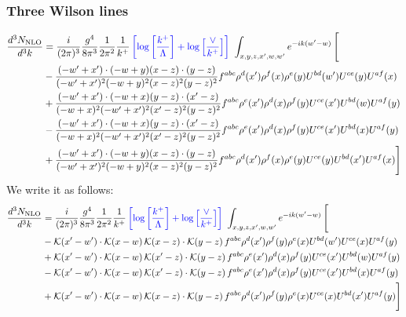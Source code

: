 \documentclass[aps,prd,amsmath,amssymb,nofootinbib]{revtex4-2}
\numberwithin{equation}{section}
\begin{document}
\subsubsection{Three Wilson lines}
\begin{align}
      \frac{d^{3}N_{\rm NLO}}{d^{3}k} & = \frac{i}{(2\pi)^{3}}\frac{g^{4}}{8\pi^{3}}\frac{1}{2\pi^{2}} \frac{1}{k^{+}}\,{\color{blue}\left[\log{\left[\frac{k^{+}}{\Lambda}\right]}+\log{\left[\frac{\vee}{k^{+}}\right]}\right]}\,\,\int_{x,y,z,x^{\prime},w,w^{\prime}}e^{-ik(w^{\prime}-w)}\, \Bigg[\notag \\ & -  \frac{( - w' + x') \cdot ( - w + y) (x - z) \cdot (y - z)}{( - w' + x')^{2} ( - w + y)^{2} (x - z)^{2} (y - z)^{2}} f^{a b c} \rho^{d}(x') \rho^{f}(x) \rho^{e}(y) U^{bd}(w') U^{ce}(y) U^{a f}(x)\nonumber\\
    &+  \frac{( - w' + x') \cdot ( - w + x) (y - z) \cdot (x' - z)}{( - w + x)^{2} ( - w' + x')^{2} (x' - z)^{2} (y - z)^{2}} f^{a b c} \rho^{e}(x') \rho^{d}(x) \rho^{f}(y) U^{ce}(x') U^{bd}(w) U^{a f}(y)\nonumber\\
    &- \frac{( - w' + x') \cdot ( - w + x) (y - z) \cdot (x' - z)}{( - w + x)^{2} ( - w' + x')^{2} (x' - z)^{2} (y - z)^{2}} f^{a b c} \rho^{e}(x') \rho^{d}(x) \rho^{f}(y) U^{ce}(x') U^{b d}(x) U^{a f}(y)\nonumber\\
    &+  \frac{( - w' + x') \cdot ( - w + y) (x - z) \cdot (y - z)}{( - w' + x')^{2} ( - w + y)^{2} (x - z)^{2} (y - z)^{2}} f^{a b c} \rho^{d}(x') \rho^{f}(x) \rho^{e}(y) U^{ce}(y) U^{b d}(x') U^{a f}(x) \Bigg]
\end{align}
We write it as follows:
\begin{align}
      \frac{d^{3}N_{\rm NLO}}{d^{3}k} & = \frac{i}{(2\pi)^{3}}\frac{g^{4}}{8\pi^{3}}\frac{1}{2\pi^{2}} \frac{1}{k^{+}}\,{\color{blue}\left[\log{\left[\frac{k^{+}}{\Lambda}\right]}+\log{\left[\frac{\vee}{k^{+}}\right]}\right]}\,\,\int_{x,y,z,x^{\prime},w,w^{\prime}}e^{-ik(w^{\prime}-w)}\, \Bigg[\notag \\ & - \mathcal{K}(x'-w')\cdot \mathcal{K}(x-w)\, \mathcal{K}(x-z)\cdot \mathcal{K}(y-z)\, f^{a b c} \rho^{d}(x') \rho^{f}(y) \rho^{e}(x) U^{bd}(w') U^{ce}(x) U^{a f}(y)\nonumber\\
    &+ \mathcal{K}(x'-w')\cdot \mathcal{K}(x-w)\,\mathcal{K}(x'-z)\cdot \mathcal{K}(y-z)\, f^{a b c} \rho^{e}(x') \rho^{d}(x) \rho^{f}(y) U^{ce}(x') U^{bd}(w) U^{a f}(y)\nonumber\\
    &- \mathcal{K}(x'-w')\cdot \mathcal{K}(x-w)\,\mathcal{K}(x'-z)\cdot \mathcal{K}(y-z)\, f^{a b c} \rho^{e}(x') \rho^{d}(x) \rho^{f}(y) U^{ce}(x') U^{b d}(x) U^{a f}(y)\nonumber\\
    &+  \mathcal{K}(x'-w')\cdot \mathcal{K}(x-w)\, \mathcal{K}(x-z)\cdot \mathcal{K}(y-z)\, f^{a b c} \rho^{d}(x') \rho^{f}(y) \rho^{e}(x) U^{ce}(x) U^{b d}(x') U^{a f}(y) \Bigg]
\end{align}
\end{document}
